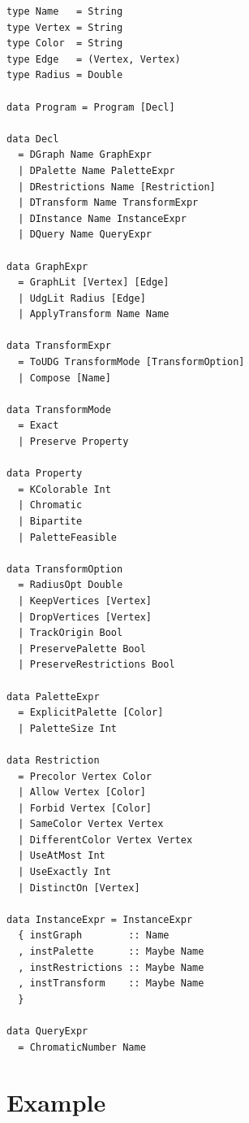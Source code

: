 \documentclass[11pt]{article}
\begin{document}
\begin{lstlisting}[style=plain]
type Name   = String
type Vertex = String
type Color  = String
type Edge   = (Vertex, Vertex)
type Radius = Double

data Program = Program [Decl]

data Decl
  = DGraph Name GraphExpr
  | DPalette Name PaletteExpr
  | DRestrictions Name [Restriction]
  | DTransform Name TransformExpr
  | DInstance Name InstanceExpr
  | DQuery Name QueryExpr

data GraphExpr
  = GraphLit [Vertex] [Edge]
  | UdgLit Radius [Edge]
  | ApplyTransform Name Name

data TransformExpr
  = ToUDG TransformMode [TransformOption]
  | Compose [Name]

data TransformMode
  = Exact
  | Preserve Property

data Property
  = KColorable Int
  | Chromatic
  | Bipartite
  | PaletteFeasible

data TransformOption
  = RadiusOpt Double
  | KeepVertices [Vertex]
  | DropVertices [Vertex]
  | TrackOrigin Bool
  | PreservePalette Bool
  | PreserveRestrictions Bool

data PaletteExpr
  = ExplicitPalette [Color]
  | PaletteSize Int

data Restriction
  = Precolor Vertex Color
  | Allow Vertex [Color]
  | Forbid Vertex [Color]
  | SameColor Vertex Vertex
  | DifferentColor Vertex Vertex
  | UseAtMost Int
  | UseExactly Int
  | DistinctOn [Vertex]

data InstanceExpr = InstanceExpr
  { instGraph        :: Name
  , instPalette      :: Maybe Name
  , instRestrictions :: Maybe Name
  , instTransform    :: Maybe Name
  }

data QueryExpr
  = ChromaticNumber Name
\end{lstlisting}

\section*{Example}
\end{document}

